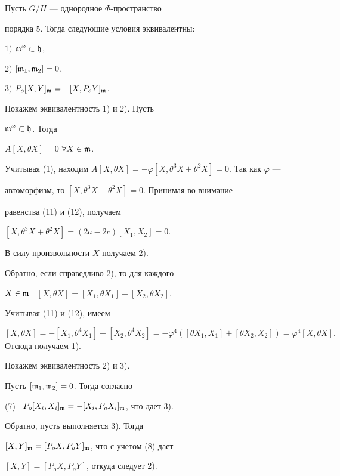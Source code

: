 \begin{thm}


Пусть $G/H$ --- однородное $\Phi$-пространство


порядка $5$. Тогда следующие условия эквивалентны\/$:$





$1)$ $\frak{m}^\varphi \subset \frak{h}$,





$2)$ $[\frak{m}_1,\frak{m}_2]=0$,





$3)$ $P_o[X,Y]_{\frak{m}}=-[X,P_oY]_{\frak{m}}$.


\end{thm}





\begin{pf}


Покажем эквивалентность 1) и 2). Пусть


$\frak{m}^\varphi \subset \frak{h}$. Тогда


$A[X,\theta X]=0$ $\forall X \in \frak{m}$.


Учитывая (1), находим $A[X,\theta


X]=-\varphi[X,\theta^3X+\theta^2X]=0$. Так как $\varphi$ ---


автоморфизм, то $[X,\theta^3X+\theta^2X]=0$. Принимая во внимание


равенства (11) и (12), получаем


$[X,\theta^3 X+\theta^2X]=(2a-2c)[X_1,X_2]=0$.


В силу произвольности $X$ получаем 2).





Обратно, если справедливо 2), то для каждого


$X\in \frak{m}$ \ $[X,\theta X]=[X_1,\theta X_1]+[X_2,\theta X_2]$.


Учитывая (11) и (12), имеем


$$


[X,\theta X]=-[X_1,\theta^4


X_1]-[X_2,\theta^4 X_2]=-\varphi^4([\theta X_1,X_1]+[\theta


X_2,X_2])=\varphi^4[X,\theta X].


$$ Отсюда получаем 1).





Покажем эквивалентность 2) и 3).


Пусть $[\frak{m}_1,\frak{m}_2]=0$. Тогда согласно


(7) \ $P_o[X_i,X_i]_{\frak{m}}=-[X_i,P_oX_i]_{\frak{m}}$, что дает 3).


Обратно, пусть выполняется 3). Тогда


$[X,Y]_{\frak{m}}=[P_oX,P_oY]_{\frak{m}}$, что с учетом (8) дает


$[X,Y]=[P_oX,P_oY]$, откуда следует 2).


\end{pf}


